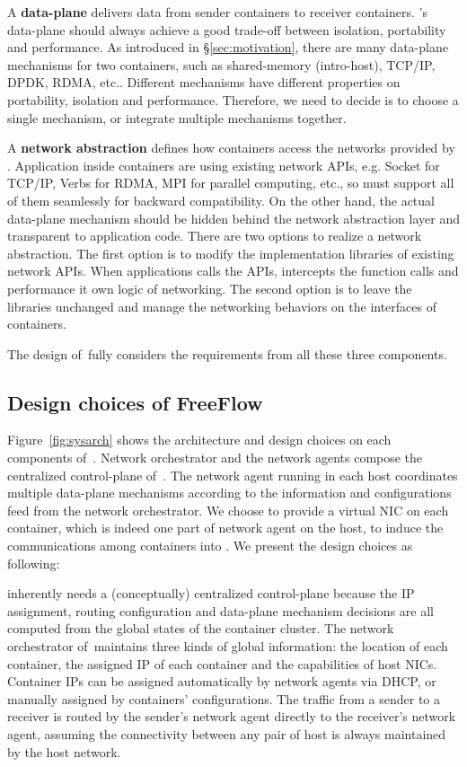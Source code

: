 A \textbf{data-plane} delivers data from sender containers to receiver 
containers. \sysname's data-plane should always achieve a good trade-off
between isolation, portability and performance. 
As introduced in \S\ref{sec:motivation}, there are many data-plane mechanisms
for two containers, such as shared-memory (intro-host), TCP/IP, DPDK, RDMA, etc..
Different mechanisms have different properties on portability, isolation and 
performance. Therefore, we need to decide is to choose a single mechanism, or
integrate multiple mechanisms together.

A \textbf{network abstraction} defines how containers access the networks
provided by \sysname. Application inside containers are using existing 
network APIs, e.g. Socket for TCP/IP, Verbs for RDMA, MPI for parallel computing, etc., so \sysname must support all of them seamlessly for 
backward compatibility. On the other hand, the actual data-plane mechanism
should be hidden behind the network abstraction layer and transparent to 
application code. There are two options to realize a network abstraction.
The first option is to modify the implementation libraries of existing
network APIs. When applications calls the APIs, \sysname intercepts
the function calls and performance it own logic of networking. 
The second option is to leave the libraries unchanged and manage the networking
behaviors on the interfaces of containers.

The design of~\sysname fully considers the requirements from all these three
components.

\subsection{Design choices of FreeFlow}

Figure~\ref{fig:sysarch} shows the architecture and design choices on each 
components of~\sysname. Network orchestrator and the network agents compose 
the centralized control-plane of~\sysname. The network agent running in each 
host coordinates multiple data-plane mechanisms according to the information and 
configurations feed from the network orchestrator. 
We choose to provide a virtual NIC on each container, which is indeed one part of network agent on the host, to induce the communications among containers 
into \sysname. We present the design choices as following:

 \sysname inherently needs a (conceptually)
centralized control-plane because the IP assignment, routing configuration and 
data-plane mechanism decisions are all computed from the global states of the
container cluster. The network orchestrator of~\sysname maintains three kinds
of global information: the location of each container, the assigned IP of each
container and the capabilities of host NICs. Container IPs can be assigned 
automatically by network agents via DHCP, or manually assigned by containers' 
configurations. The traffic from a sender
to a receiver is routed by the sender's network agent directly to 
the receiver's network agent, assuming the connectivity between
any pair of host is always maintained by the host network. 

